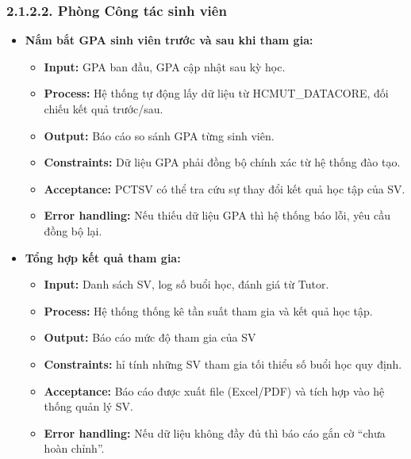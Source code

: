 \subsubsection*{2.1.2.2. Phòng Công tác sinh viên}
\begin{itemize}
    \item \textbf{Nắm bắt GPA sinh viên trước và sau khi tham gia:}
    \begin{itemize}
        \item \textbf{Input:} GPA ban đầu, GPA cập nhật sau kỳ học.
        \item \textbf{Process:} Hệ thống tự động lấy dữ liệu từ HCMUT\_DATACORE, đối chiếu kết quả trước/sau.
        \item \textbf{Output:} Báo cáo so sánh GPA từng sinh viên.
        \item \textbf{Constraints:} Dữ liệu GPA phải đồng bộ chính xác từ hệ thống đào tạo.
        \item \textbf{Acceptance:} PCTSV có thể tra cứu sự thay đổi kết quả học tập của SV.
        \item \textbf{Error handling:} Nếu thiếu dữ liệu GPA thì hệ thống báo lỗi, yêu cầu đồng bộ lại.
    \end{itemize}
    
    \item \textbf{Tổng hợp kết quả tham gia:}
    \begin{itemize}
        \item \textbf{Input:} Danh sách SV, log số buổi học, đánh giá từ Tutor.
        \item \textbf{Process:} Hệ thống thống kê tần suất tham gia và kết quả học tập.
        \item \textbf{Output:} Báo cáo mức độ tham gia của SV
        \item \textbf{Constraints:} hỉ tính những SV tham gia tối thiểu số buổi học quy định.
        \item \textbf{Acceptance:} Báo cáo được xuất file (Excel/PDF) và tích hợp vào hệ thống quản lý SV.
        \item \textbf{Error handling:} Nếu dữ liệu không đầy đủ thì báo cáo gắn cờ “chưa hoàn chỉnh”.
    \end{itemize}
    

\end{itemize}
